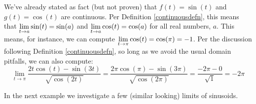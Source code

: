 \documentclass{ximera}
\begin{document}
We've already stated as fact (but not proven) that $f(t) = \sin(t)$ and $g(t) = \cos(t)$ are continuous.  Per Definition \ref{continuousdefn}, this means that $\ds{\lim_{t \rightarrow a} \sin(t) = \sin(a)}$ and $\ds{\lim_{t \rightarrow a} \cos(t) = \cos(a)}$ for all real numbers, $a$.  This means, for instance, we can compute  $\ds{\lim_{t \rightarrow \pi} \cos(t) = \cos(\pi) = -1}$.  Per the discussion following Definition \ref{continuousdefn}, so long as we avoid the usual domain pitfalls, we can also compute:
 \[ \lim_{t \rightarrow \pi} \frac{2t \cos(t) - \sin(3t)}{\sqrt{\cos(2t)}} = \frac{2 \pi \cos(\pi) - \sin(3\pi)}{\sqrt{\cos(2\pi)}} = \frac{-2\pi - 0}{\sqrt{1}} = - 2\pi \]
 
 In the next example we investigate a few (similar looking) limits of sinusoids.
 
 \pagebreak
 
\end{document}
